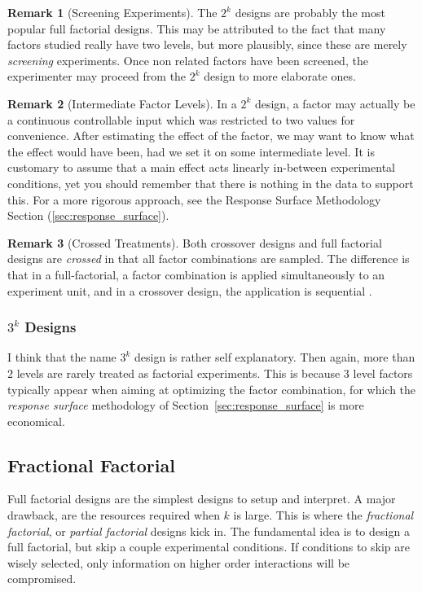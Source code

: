 \documentclass[12pt,a4paper]{report}
\theoremstyle{plain}
\theoremstyle{definition}
\newtheorem{remark}{Remark}
\begin{document}
\begin{remark}[Screening Experiments]
The $2^k$ designs are probably the most popular full factorial designs. 
This may be attributed to the fact that many factors studied really have two levels, but more plausibly, since these are merely \emph{screening} experiments. 
Once non related factors have been screened, the experimenter may proceed from the $2^k$ design to more elaborate ones. 
\end{remark}



\begin{remark}[Intermediate Factor Levels]
In a $2^k$ design, a factor may actually be a continuous controllable input which was restricted to two values for convenience. 
After estimating the effect of the factor, we may want to know what the effect would have been, had we set it on some intermediate level.
It is customary to assume that a main effect acts linearly in-between experimental conditions, yet you should remember that there is nothing in the data to support this.
For a more rigorous approach, see the Response Surface Methodology Section (\ref{sec:response_surface}).
\end{remark}


\begin{remark}[Crossed Treatments]
Both crossover designs and full factorial designs are \emph{crossed} in that all factor combinations are sampled. 
The difference is that in a full-factorial, a factor combination is applied simultaneously to an experiment unit, and in a crossover design, the application is sequential \citep{everitt_cambridge_2010}.
\end{remark}



\subsubsection{$3^k$ Designs}
I think that the name $3^k$ design is rather self explanatory.
Then again, more than $2$ levels are rarely treated as factorial experiments. 
This is because $3$ level factors typically appear when aiming at optimizing the factor combination, for which the \emph{response surface} methodology of Section~\ref{sec:response_surface} is more economical.




\subsection{Fractional Factorial}
Full factorial designs are the simplest designs to setup and interpret. 
A major drawback, are the resources required when $k$ is large. 
This is where the \emph{fractional factorial}, or \emph{partial factorial} designs kick in.
The fundamental idea is to design a full factorial, but skip a couple experimental conditions. If conditions to skip are wisely selected, only information on higher order interactions will be compromised.
\end{document}
